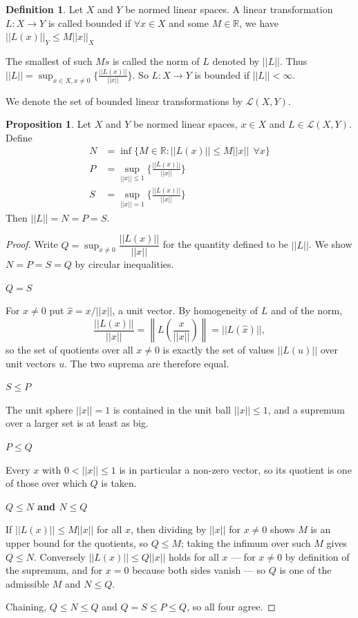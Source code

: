 \documentclass[11pt,a4paper]{article}
\theoremstyle{definition}
\newtheorem{defn}[thm]{Definition}
\newtheorem{prop}[thm]{Proposition}
\newcommand{\subhead}[1]{%
  \par\medskip\noindent\textbf{#1}\par\nobreak\smallskip}
\begin{document}
\begin{defn}
Let $X$ and $Y$ be normed linear spaces. A linear transformation $L:X\rightarrow Y$ is called bounded if $\forall x\in X$ and some $M\in \mathbb{R}$, we have \hspace{0.3cm}$||L(x)||_Y\leq M||x||_X$


The smallest of such $Ms$ is called the norm of $L$ denoted by $||L||$. Thus \hspace{0.3cm}$\displaystyle{||L||=\sup_{x\in X,x\neq 0}\Bigg\{\frac{||L(x)||}{||x||}\Bigg\}}.$ So $L:X\rightarrow Y$ is bounded if $||L||<\infty$.


We denote the set of bounded linear transformations by $\mathcal{L}(X,Y)$.

\end{defn}


\begin{prop}
Let $X$ and $Y$ be normed linear spaces, $x\in X$ and $L\in \mathcal{L}(X,Y)$. Define 
\begin{align*}
N & =\inf \{M\in \mathbb{R}:||L(x)||\leq M||x||\ \ \forall x\}\\
P & =\sup_{||x||\leq 1}\Bigg\{\frac{||L(x)||}{||x||}\Bigg\}\\
S & =\sup_{||x||=1}\Bigg\{\frac{||L(x)||}{||x||}\Bigg\}
\end{align*}
Then $||L||=N=P=S$.


\end{prop}
\begin{proof}
Write $Q=\sup_{x\neq 0}\dfrac{||L(x)||}{||x||}$ for the quantity defined to be
$||L||$. We show $N=P=S=Q$ by circular inequalities.

\subhead{$Q=S$}
For $x\neq 0$ put $\hat{x}=x/||x||$, a unit vector. By homogeneity of $L$ and of
the norm,
$$\frac{||L(x)||}{||x||}=\left\|L\!\left(\frac{x}{||x||}\right)\right\|
=||L(\hat{x})|| ,$$
so the set of quotients over all $x\neq 0$ is exactly the set of values
$||L(u)||$ over unit vectors $u$. The two suprema are therefore equal.

\subhead{$S\leq P$}
The unit sphere $||x||=1$ is contained in the unit ball $||x||\leq 1$, and a
supremum over a larger set is at least as big.

\subhead{$P\leq Q$}
Every $x$ with $0<||x||\leq 1$ is in particular a non-zero vector, so its
quotient is one of those over which $Q$ is taken.

\subhead{$Q\leq N$ and $N\leq Q$}
If $||L(x)||\leq M||x||$ for all $x$, then dividing by $||x||$ for $x\neq 0$
shows $M$ is an upper bound for the quotients, so $Q\leq M$; taking the
infimum over such $M$ gives $Q\leq N$. Conversely $||L(x)||\leq Q||x||$ holds
for all $x$ --- for $x\neq 0$ by definition of the supremum, and for $x=0$
because both sides vanish --- so $Q$ is one of the admissible $M$ and $N\leq Q$.

Chaining, $Q\leq N\leq Q$ and $Q=S\leq P\leq Q$, so all four agree.
\end{proof}
\end{document}

